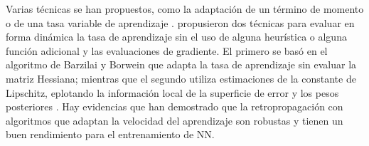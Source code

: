 Varias técnicas se han propuestos, como la adaptación de un término de momento \cite{Jacobs1988, Rumelhart1986b} o de una tasa variable de aprendizaje \cite{Jacobs1988,Vogl1988}.  propusieron dos técnicas para evaluar en forma dinámica la tasa de aprendizaje sin el uso de alguna heurística o alguna función adicional y las evaluaciones de gradiente. El primero se basó en el algoritmo de Barzilai y Borwein \cite{Barzilai1988} que adapta la tasa de aprendizaje sin evaluar la matriz Hessiana; mientras que el segundo utiliza estimaciones de la constante de Lipschitz, eplotando la información local de la superficie de error y los pesos posteriores \cite{Magoulas1997}. Hay evidencias \cite{Magoulas1997, Plagianakos2002, Plagianakos1998} que han demostrado que la retropropagación con algoritmos que adaptan la velocidad del aprendizaje son robustas y tienen un buen rendimiento para el entrenamiento de NN.






